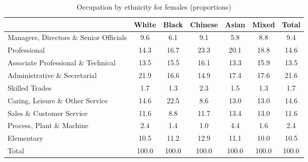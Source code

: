 \begin{table}[htbp]\centering
\def\sym#1{\ifmmode^{#1}\else\(^{#1}\)\fi}
\caption{Occupation by ethnicity for females (proportions)}
\begin{tabular}{l*{6}{c}}
\hline\hline
          &    White&    Black&  Chinese&    Asian&    Mixed&    Total\\
\hline
Managers, Directors \& Senior Officials         &      9.6&      6.1&      9.1&      5.8&      8.8&      9.4\\
Professional         &     14.3&     16.7&     23.3&     20.1&     18.8&     14.6\\
Associate Professional \& Technical         &     13.5&     15.5&     16.1&     13.3&     15.9&     13.5\\
Administrative \& Secretarial         &     21.9&     16.6&     14.9&     17.4&     17.6&     21.6\\
Skilled Trades         &      1.7&      1.3&      2.3&      1.5&      1.3&      1.7\\
Caring, Leisure \& Other Service          &     14.6&     22.5&      8.6&     13.0&     13.0&     14.6\\
Sales \& Customer Service         &     11.6&      8.8&     11.7&     13.4&     13.0&     11.6\\
Process, Plant \& Machine         &      2.4&      1.4&      1.0&      4.4&      1.6&      2.4\\
Elementary         &     10.5&     11.2&     12.9&     11.1&     10.0&     10.5\\
Total     &    100.0&    100.0&    100.0&    100.0&    100.0&    100.0\\
\hline\hline
\end{tabular}
\label{tab:occup_female}
\end{table}
